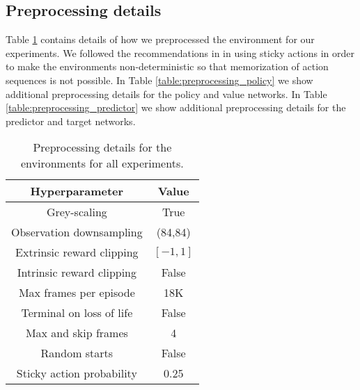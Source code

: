 \documentclass{article} \usepackage[dvipsnames]{xcolor}
\begin{document}
\subsection{Preprocessing details}
\label{sec:proprocessing}
Table \ref{table:preprocessing_env} contains details of how we preprocessed the environment for our experiments. We followed the recommendations in \cite{machado2017revisiting} in using sticky actions in order to make the environments non-deterministic so that memorization of action sequences is not possible. In Table \ref{table:preprocessing_policy} we show additional preprocessing details for the policy and value networks. In Table \ref{table:preprocessing_predictor} we show additional preprocessing details for the predictor and target networks.
\begin{table}[ht]
\centering
\begin{tabular}{c | c} 
 Hyperparameter & Value  \\ [0.5ex] 
 \hline
 Grey-scaling & True  \\ 
 Observation downsampling & (84,84)  \\
 Extrinsic reward clipping & $[-1,1]$  \\
 Intrinsic reward clipping & False  \\
 Max frames per episode & 18K \\
 Terminal on loss of life & False \\
 Max and skip frames & 4 \\
 Random starts & False \\
 Sticky action probability & 0.25 \\ [1ex] 
\end{tabular}
\caption{Preprocessing details for the environments for all experiments.}
\label{table:preprocessing_env}
\end{table}
\end{document}
